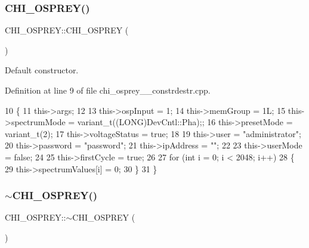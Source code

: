 \subsubsection{\texorpdfstring{C\+H\+I\+\_\+\+O\+S\+P\+R\+E\+Y()}{CHI\_OSPREY()}}
{\footnotesize\ttfamily C\+H\+I\+\_\+\+O\+S\+P\+R\+E\+Y\+::\+C\+H\+I\+\_\+\+O\+S\+P\+R\+EY (\begin{DoxyParamCaption}{ }\end{DoxyParamCaption})}

Default constructor. 

Definition at line 9 of file chi\+\_\+osprey\+\_\+\_\+constrdestr.\+cpp.


\begin{DoxyCode}
10 \{
11     this->args;
12 
13     this->ospInput          = 1;
14     this->memGroup          = 1L;
15     this->spectrumMode      = variant\_t((LONG)DevCntl::Pha);;
16     this->presetMode        = variant\_t(2);
17     this->voltageStatus     = \textcolor{keyword}{true};
18 
19     this->user              = \textcolor{stringliteral}{"administrator"};
20     this->password          = \textcolor{stringliteral}{"password"};
21     this->ipAddress         = \textcolor{stringliteral}{""};
22 
23     this->userMode          = \textcolor{keyword}{false};
24 
25     this->firstCycle = \textcolor{keyword}{true};
26 
27     \textcolor{keywordflow}{for} (\textcolor{keywordtype}{int} i = 0; i < 2048; i++)
28     \{
29         this->spectrumValues[i] = 0;
30     \}
31 \}
\end{DoxyCode}
\mbox{\label{class_c_h_i___o_s_p_r_e_y_adfb630759c9dfe8d0d55079cf1e2bf4e_adfb630759c9dfe8d0d55079cf1e2bf4e}} 
\subsubsection{\texorpdfstring{$\sim$\+C\+H\+I\+\_\+\+O\+S\+P\+R\+E\+Y()}{~CHI\_OSPREY()}}
{\footnotesize\ttfamily C\+H\+I\+\_\+\+O\+S\+P\+R\+E\+Y\+::$\sim$\+C\+H\+I\+\_\+\+O\+S\+P\+R\+EY (\begin{DoxyParamCaption}{ }\end{DoxyParamCaption})}

